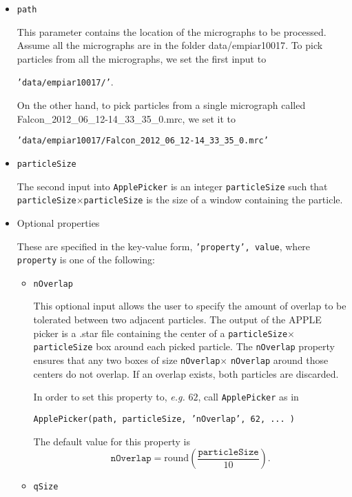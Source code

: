 \documentclass[12pt,a4paper]{article}
\begin{document}
\begin{itemize}[leftmargin=0.5cm]
\item \texttt{path}

This parameter contains the location of the micrographs to be processed. Assume all the micrographs are in the folder \textsf{data/empiar10017}. To pick particles from all the micrographs, we set the first input to
\begin{center}
\texttt{'data/empiar10017/'}.
\end{center}
On the other hand, to pick particles from a single micrograph called \textsf{Falcon\_2012\_06\_12-14\_33\_35\_0.mrc}, we set it to
\begin{center}
\texttt{'data/empiar10017/Falcon\_2012\_06\_12-14\_33\_35\_0.mrc'}
\end{center}

\item \texttt{particleSize}

The second input into \texttt{ApplePicker} is an integer \texttt{particleSize} such that \texttt{particleSize}$\times$\texttt{particleSize} is the size of a window containing the particle.

\item Optional properties

These are specified in the key-value form, \texttt{'property', value}, where \texttt{property} is one of the following:
\begin{itemize}[leftmargin=0.5cm]
\item \texttt{nOverlap}

This optional input allows the user to specify the amount of overlap to be tolerated between two adjacent particles.
The output of the APPLE picker is a .star file containing the center of a \texttt{particleSize}$\times$\texttt{particleSize} box
around each picked particle.  The \texttt{nOverlap} property ensures that any two boxes of size \texttt{nOverlap}$\times$ \texttt{nOverlap}
around those centers do not overlap. If an overlap exists, both particles are discarded.

In order to set this property to, \textit{e.g.} $62$, call \texttt{ApplePicker} as in
\begin{center}
\texttt{ApplePicker(path, particleSize, 'nOverlap', 62, ... )}
\end{center}

The default value for this property is $$\texttt{nOverlap}=\text{round} \left( \frac{\texttt{particleSize}}{10} \right).$$

\item \texttt{qSize}


\end{itemize}
\end{itemize}
\end{document}
